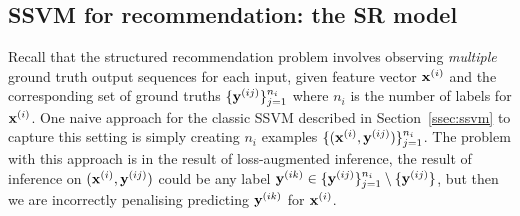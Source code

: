 \secmoveup
\subsection{SSVM for recommendation: the SR model}
\label{ssec:sr}
\textmoveup

Recall that the structured recommendation problem
involves observing \emph{multiple} ground truth output sequences for each input, \ie
given feature vector $\mathbf{x}^{(i)}$ and the corresponding set of ground truths $\{\mathbf{y}^{(ij)}\}_{j=1}^{n_i}$
where $n_i$ is the number of labels for $\mathbf{x}^{(i)}$.
One naive approach for the classic SSVM described in Section~\ref{ssec:ssvm} to capture this setting is simply creating 
$n_i$ examples $\{(\mathbf{x}^{(i)}, \mathbf{y}^{(ij)})\}_{j=1}^{n_i}$. 
The problem with this approach is in the result of loss-augmented inference, 
\ie the result of inference on $(\mathbf{x}^{(i)}, \mathbf{y}^{(ij)})$ could be any label $\mathbf{y}^{(ik)} \in \{\mathbf{y}^{(ij)}\}_{j=1}^{n_i} \setminus \{\mathbf{y}^{(ij)}\}$,
but then we are incorrectly penalising predicting $\mathbf{y}^{(ik)}$ for $\mathbf{x}^{(i)}$. 

